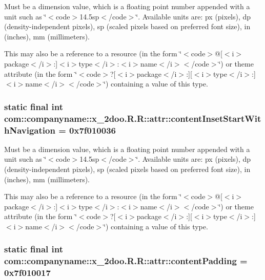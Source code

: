 Must be a dimension value, which is a floating point number appended with a unit such as \char`\"{}$<$code$>$14.5sp$<$/code$>$\char`\"{}. Available units are: px (pixels), dp (density-independent pixels), sp (scaled pixels based on preferred font size), in (inches), mm (millimeters). 

This may also be a reference to a resource (in the form \char`\"{}$<$code$>$@\mbox{[}$<$i$>$package$<$/i$>$:\mbox{]}$<$i$>$type$<$/i$>$:$<$i$>$name$<$/i$>$$<$/code$>$\char`\"{}) or theme attribute (in the form \char`\"{}$<$code$>$?\mbox{[}$<$i$>$package$<$/i$>$:\mbox{]}\mbox{[}$<$i$>$type$<$/i$>$:\mbox{]}$<$i$>$name$<$/i$>$$<$/code$>$\char`\"{}) containing a value of this type. \hypertarget{classcom_1_1companyname_1_1x__2doo_1_1_r_1_1attr_dc8987105bb00e0753b0e251a2e2c21e}{
\subsubsection[{contentInsetStartWithNavigation}]{\setlength{\rightskip}{0pt plus 5cm}static final int com::companyname::x\_\-2doo.R.R::attr::contentInsetStartWithNavigation = 0x7f010036}}
\label{classcom_1_1companyname_1_1x__2doo_1_1_r_1_1attr_dc8987105bb00e0753b0e251a2e2c21e}


Must be a dimension value, which is a floating point number appended with a unit such as \char`\"{}$<$code$>$14.5sp$<$/code$>$\char`\"{}. Available units are: px (pixels), dp (density-independent pixels), sp (scaled pixels based on preferred font size), in (inches), mm (millimeters). 

This may also be a reference to a resource (in the form \char`\"{}$<$code$>$@\mbox{[}$<$i$>$package$<$/i$>$:\mbox{]}$<$i$>$type$<$/i$>$:$<$i$>$name$<$/i$>$$<$/code$>$\char`\"{}) or theme attribute (in the form \char`\"{}$<$code$>$?\mbox{[}$<$i$>$package$<$/i$>$:\mbox{]}\mbox{[}$<$i$>$type$<$/i$>$:\mbox{]}$<$i$>$name$<$/i$>$$<$/code$>$\char`\"{}) containing a value of this type. \hypertarget{classcom_1_1companyname_1_1x__2doo_1_1_r_1_1attr_7764b1e257d6d500ac29087f6a69cdba}{
\subsubsection[{contentPadding}]{\setlength{\rightskip}{0pt plus 5cm}static final int com::companyname::x\_\-2doo.R.R::attr::contentPadding = 0x7f010017}}
\label{classcom_1_1companyname_1_1x__2doo_1_1_r_1_1attr_7764b1e257d6d500ac29087f6a69cdba}


